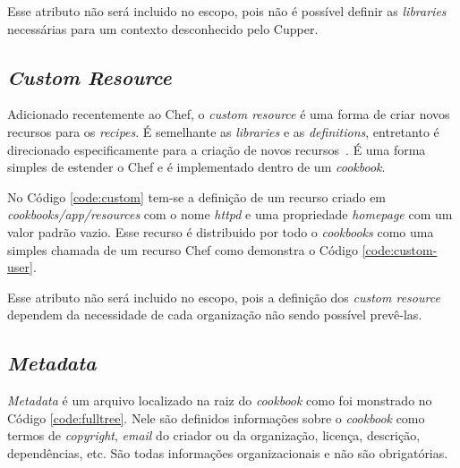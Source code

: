 Esse atributo não será incluido no escopo, pois não é possível definir as \textit{libraries}
necessárias para um contexto desconhecido pelo Cupper.

\subsection{\textit{Custom Resource}}
\label{sec:lev-rec-cust}

Adicionado recentemente ao Chef, o \textit{custom resource} é uma forma de criar
novos recursos para os \textit{recipes}. É semelhante as \textit{libraries} e as \textit{definitions},
entretanto é direcionado especificamente para a criação de novos recursos~\cite{chefdoc:2016}.
É uma forma simples de estender o Chef e é implementado dentro de um
\textit{cookbook}.

No Código \ref{code:custom} tem-se a definição de um recurso criado em \textit{cookbooks/app/resources}
com o nome \textit{httpd} e uma propriedade \textit{homepage} com um valor padrão vazio.
Esse recurso é distribuido por todo o \textit{cookbooks} como uma simples chamada
de um recurso Chef como demonstra o Código \ref{code:custom-user}.

\noindent\begin{minipage}{.45\textwidth}
  \lstset{style=shell}
  
\end{minipage}\hfill
\begin{minipage}{.45\textwidth}
  \lstset{style=shell}
  
\end{minipage}

Esse atributo não será incluido no escopo, pois a definição dos \textit{custom resource} dependem
da necessidade de cada organização não sendo possível prevê-las.

\subsection{\textit{Metadata}}
\label{sec:cbmetadata}

\textit{Metadata} é um arquivo localizado na raiz do \textit{cookbook} como foi monstrado no Código
\ref{code:fulltree}. Nele são definidos informações sobre o \textit{cookbook} como termos de \textit{copyright},
\textit{email} do criador ou da organização, licença, descrição, dependências, etc. São 
todas informações organizacionais e não são obrigatórias.

